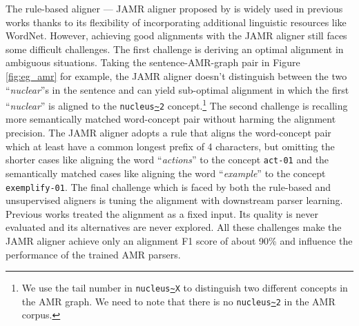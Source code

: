 \documentclass[11pt,a4paper]{article}
\begin{document}
The rule-based aligner --- JAMR aligner proposed by \citet{flanigan-EtAl:2014:P14-1}
is widely used in previous works 
thanks to its flexibility of incorporating additional linguistic resources
like WordNet.
However, achieving good alignments with the JAMR aligner still faces some difficult challenges.
The first challenge is deriving an optimal alignment in ambiguous situations.
Taking the sentence-AMR-graph pair in Figure \ref{fig:eg_amr} for example,
the JAMR aligner doesn't distinguish between the two ``{\it nuclear}''s in the sentence
and can yield sub-optimal alignment in which the first ``{\it nuclear}'' is aligned
to the {\tt nucleus\url{~}2} concept.\footnote{We use the tail number in {\tt nucleus\url{~}X}
to distinguish two different concepts in the AMR graph.
We need to note that there is no {\tt nucleus\url{~}2} in the AMR corpus.}
The second challenge is recalling more semantically matched word-concept pair
without harming the alignment precision.
The JAMR aligner adopts a rule that aligns the word-concept pair
which at least have a common longest prefix of 4 characters,
but omitting the shorter cases like aligning the word ``\textit{actions}'' to the concept \texttt{act-01}
and the semantically matched cases like aligning the word ``\textit{example}'' to the concept \texttt{exemplify-01}.
The final challenge which is faced by both the rule-based and unsupervised aligners
is tuning the alignment with downstream parser learning.
Previous works treated the alignment as a fixed input.
Its quality is never evaluated and its alternatives are never explored.
All these challenges make the JAMR aligner achieve only an alignment F1 score
of about 90\% and
influence the performance of the trained AMR parsers.
\end{document}
